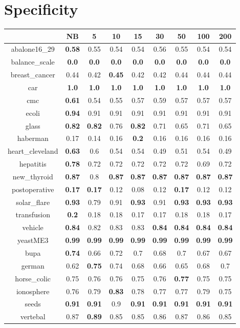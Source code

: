 \documentclass{article}%
\begin{document}
%
\section*{Specificity}%
\begin{tabular}{c|cccccccc}%
\hline%
&NB&5&10&15&30&50&100&200\\%
\hline%
abalone16\_29&\textbf{0.58}&0.55&0.54&0.54&0.56&0.55&0.54&0.54\\%
\hline%
balance\_scale&\textbf{0.0}&\textbf{0.0}&\textbf{0.0}&\textbf{0.0}&\textbf{0.0}&\textbf{0.0}&\textbf{0.0}&\textbf{0.0}\\%
\hline%
breast\_cancer&0.44&0.42&\textbf{0.45}&0.42&0.42&0.44&0.44&0.44\\%
\hline%
car&\textbf{1.0}&\textbf{1.0}&\textbf{1.0}&\textbf{1.0}&\textbf{1.0}&\textbf{1.0}&\textbf{1.0}&\textbf{1.0}\\%
\hline%
cmc&\textbf{0.61}&0.54&0.55&0.57&0.59&0.57&0.57&0.57\\%
\hline%
ecoli&\textbf{0.94}&0.91&0.91&0.91&0.91&0.91&0.91&0.91\\%
\hline%
glass&\textbf{0.82}&\textbf{0.82}&0.76&\textbf{0.82}&0.71&0.65&0.71&0.65\\%
\hline%
haberman&0.17&0.14&0.16&\textbf{0.2}&0.16&0.16&0.16&0.16\\%
\hline%
heart\_cleveland&\textbf{0.63}&0.6&0.54&0.54&0.49&0.51&0.54&0.49\\%
\hline%
hepatitis&\textbf{0.78}&0.72&0.72&0.72&0.72&0.72&0.69&0.72\\%
\hline%
new\_thyroid&\textbf{0.87}&0.8&\textbf{0.87}&\textbf{0.87}&\textbf{0.87}&\textbf{0.87}&\textbf{0.87}&\textbf{0.87}\\%
\hline%
postoperative&\textbf{0.17}&\textbf{0.17}&0.12&0.08&0.12&\textbf{0.17}&0.12&0.12\\%
\hline%
solar\_flare&\textbf{0.93}&0.79&0.91&\textbf{0.93}&0.91&\textbf{0.93}&\textbf{0.93}&\textbf{0.93}\\%
\hline%
transfusion&\textbf{0.2}&0.18&0.18&0.17&0.17&0.18&0.18&0.17\\%
\hline%
vehicle&\textbf{0.84}&0.82&0.83&0.83&\textbf{0.84}&\textbf{0.84}&\textbf{0.84}&\textbf{0.84}\\%
\hline%
yeastME3&\textbf{0.99}&\textbf{0.99}&\textbf{0.99}&\textbf{0.99}&\textbf{0.99}&\textbf{0.99}&\textbf{0.99}&\textbf{0.99}\\%
\hline%
bupa&\textbf{0.74}&0.66&0.72&0.7&0.68&0.7&0.67&0.67\\%
\hline%
german&0.62&\textbf{0.75}&0.74&0.68&0.66&0.65&0.68&0.7\\%
\hline%
horse\_colic&0.75&0.76&0.76&0.75&0.76&\textbf{0.77}&0.75&0.75\\%
\hline%
ionosphere&0.76&0.79&\textbf{0.83}&0.78&0.77&0.77&0.79&0.75\\%
\hline%
seeds&\textbf{0.91}&\textbf{0.91}&0.9&\textbf{0.91}&\textbf{0.91}&\textbf{0.91}&\textbf{0.91}&\textbf{0.91}\\%
\hline%
vertebal&0.87&\textbf{0.89}&0.85&0.85&0.86&0.87&0.86&0.85\\%
\hline%
\end{tabular}
\end{document}

